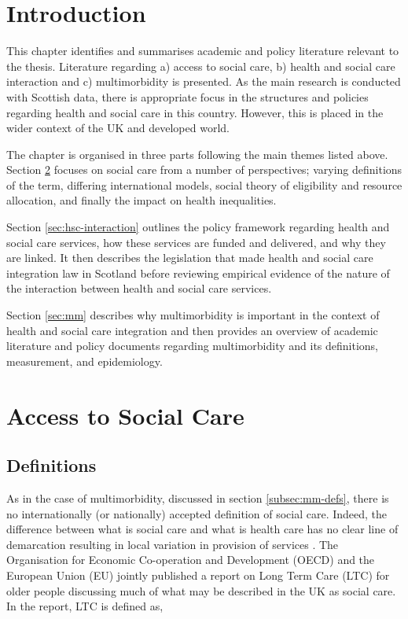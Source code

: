 \documentclass[12pt,]{report}
\begin{document}
\section{Introduction}\label{sec:lit-review-intro}

This chapter identifies and summarises academic and policy literature
relevant to the thesis. Literature regarding a) access to social care,
b) health and social care interaction and c) multimorbidity is
presented. As the main research is conducted with Scottish data, there
is appropriate focus in the structures and policies regarding health and
social care in this country. However, this is placed in the wider
context of the UK and developed world.

The chapter is organised in three parts following the main themes listed
above. Section \ref{sec:access-sc} focuses on social care from a number
of perspectives; varying definitions of the term, differing
international models, social theory of eligibility and resource
allocation, and finally the impact on health inequalities.

Section \ref{sec:hsc-interaction} outlines the policy framework
regarding health and social care services, how these services are funded
and delivered, and why they are linked. It then describes the
legislation that made health and social care integration law in Scotland
before reviewing empirical evidence of the nature of the interaction
between health and social care services.

Section \ref{sec:mm} describes why multimorbidity is important in the
context of health and social care integration and then provides an
overview of academic literature and policy documents regarding
multimorbidity and its definitions, measurement, and epidemiology.

\section{Access to Social Care}\label{sec:access-sc}

\subsection{Definitions}\label{subsec:access-sc-defs}

As in the case of multimorbidity, discussed in section
\ref{subsec:mm-defs}, there is no internationally (or nationally)
accepted definition of social care. Indeed, the difference between what
is social care and what is health care has no clear line of demarcation
resulting in local variation in provision of services \citep{RN371}. The
Organisation for Economic Co-operation and Development (OECD) and the
European Union (EU) jointly published a report on Long Term Care (LTC)
for older people discussing much of what may be described in the UK as
social care. In the report, LTC is defined as,
\end{document}
